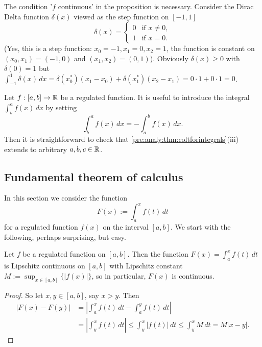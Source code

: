\documentclass[10pt, a4paper]{article}
\begin{document}
\begin{example}
    The condition '$f$ continuous' in the proposition is necessary.
    Consider the Dirac Delta function $\delta(x)$ viewed as the step function on $[-1, 1]$
    \[
    \delta(x) = \begin{cases}
        0 &\text{if } x \neq 0, \\
        1 &\text{if } x = 0.
    \end{cases}
    \]
    (Yes,
    this is a step function:
    $x_0 = -1, x_1 = 0, x_2 = 1$,
    the function is constant on $(x_0, x_1) = (-1, 0)$ and $(x_1, x_2) = (0, 1)$).
    Obviously $\delta(x) \geq 0$ with $\delta(0) = 1$ but $\int_{-1}^{1}\delta(x)\,dx = \delta(x_0 ^ {*})(x_1 - x_0) + \delta(x_1 ^ {*})(x_2 - x_1) = 0 \cdot 1 + 0 \cdot 1 = 0$.
\end{example}

\begin{remark}
    Let $f : [a, b] \rightarrow \mathbb{R}$ be a regulated function.
    It is useful to introduce the integral $\int_{b}^{a}f(x)\,dx$ by setting
    \[
    \int_{b}^{a}f(x)\,dx = -\int_{a}^{b}f(x)\,dx.
    \]
    Then it is straightforward to check that \autoref{pre:analy:thm:coltforintegrals}(iii) extends to arbitrary $a, b, c \in \mathbb{R}$.
\end{remark}

\subsection{Fundamental theorem of calculus}

In this section we consider the function
\[
F(x) := \int_{a}^{x}f(t)\,dt
\]
for a regulated function $f(x)$ on the interval $[a, b]$.
We start with the following,
perhaps surprising,
but easy.
\begin{theorem}\label{pre:analy:thm:definintislipschitzcontonint}
    Let $f$ be a regulated function on $[a, b]$.
    Then the function $F(x) = \int_{a}^{x}f(t)\,dt$ is Lipschitz continuous on $[a, b]$ with Lipschitz constant $M := \sup_{x \in [a, b]}\{|f(x)|\}$,
    so in particular,
    $F(x)$ is continuous.
    \begin{proof}
        So let $x, y \in [a, b]$,
        say $x > y$.
        Then
        \begin{align*}
            |F(x) - F(y)| &= \left|\int_{a}^{x}f(t)\,dt - \int_{a}^{y}f(t)\,dt\right| \\
            &= \left|\int_{y}^{x}f(t)\,dt\right| \leq \int_{y}^{x}|f(t)|\,dt \leq \int_{y}^{x}M\,dt = M|x - y|.
        \end{align*}
    \end{proof}
\end{theorem}
\end{document}
